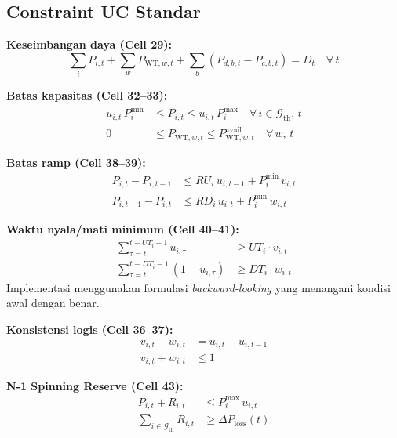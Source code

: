 \documentclass[journal]{IEEEtran}
\newcommand{\Ploss}{\Delta P_{\mathrm{loss}}}
\begin{document}
\subsection{Constraint UC Standar}

\textbf{Keseimbangan daya (Cell 29):}
\begin{equation}
  \sum_{i} P_{i,t} + \sum_{w} P_{\mathrm{WT},w,t}
  + \sum_{b} (P_{d,b,t} - P_{c,b,t}) = D_t \quad \forall\,t
  \label{eq:balance}
\end{equation}

\textbf{Batas kapasitas (Cell 32--33):}
\begin{align}
  u_{i,t}\,P_i^{\min} &\leq P_{i,t} \leq u_{i,t}\,P_i^{\max}
    \quad \forall\,i \in \mathcal{G}_{\mathrm{th}},\,t \label{eq:cap_th}\\
  0 &\leq P_{\mathrm{WT},w,t} \leq P_{\mathrm{WT},w,t}^{\mathrm{avail}}
    \quad \forall\,w,\,t \label{eq:cap_wt}
\end{align}

\textbf{Batas ramp (Cell 38--39):}
\begin{align}
  P_{i,t} - P_{i,t-1} &\leq RU_i\,u_{i,t-1} + P_i^{\min}\,v_{i,t}
    \label{eq:ramp_up}\\
  P_{i,t-1} - P_{i,t} &\leq RD_i\,u_{i,t} + P_i^{\min}\,w_{i,t}
    \label{eq:ramp_down}
\end{align}

\textbf{Waktu nyala/mati minimum (Cell 40--41):}
\begin{align}
  \sum_{\tau=t}^{t+UT_i-1} u_{i,\tau} &\geq UT_i \cdot v_{i,t}
    \label{eq:mut}\\
  \sum_{\tau=t}^{t+DT_i-1} (1-u_{i,\tau}) &\geq DT_i \cdot w_{i,t}
    \label{eq:mdt}
\end{align}
Implementasi menggunakan formulasi \textit{backward-looking}
yang menangani kondisi awal dengan benar.

\textbf{Konsistensi logis (Cell 36--37):}
\begin{align}
  v_{i,t} - w_{i,t} &= u_{i,t} - u_{i,t-1} \label{eq:logic}\\
  v_{i,t} + w_{i,t} &\leq 1 \label{eq:non_sim}
\end{align}

\textbf{N-1 Spinning Reserve (Cell 43):}
\begin{align}
  P_{i,t} + R_{i,t} &\leq P_i^{\max}\,u_{i,t}
    \label{eq:res_headroom}\\
  \sum_{i \in \mathcal{G}_{\mathrm{th}}} R_{i,t}
    &\geq \Ploss(t) \label{eq:n1_res}
\end{align}
\end{document}
